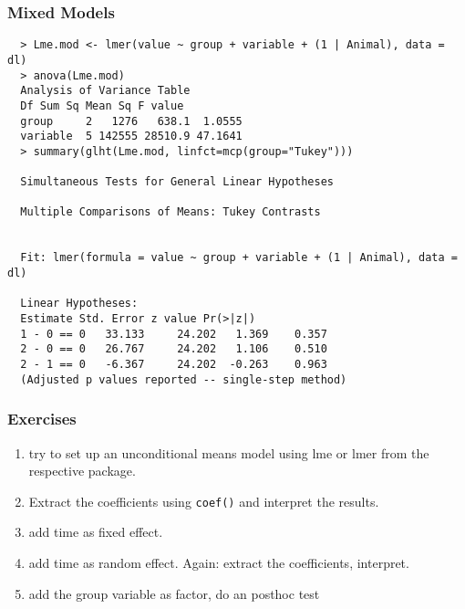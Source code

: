 \begin{frame}\frametitle{Mixed Models}
\scriptsize
\begin{verbatim}
  > Lme.mod <- lmer(value ~ group + variable + (1 | Animal), data = dl)
  > anova(Lme.mod)
  Analysis of Variance Table
  Df Sum Sq Mean Sq F value
  group     2   1276   638.1  1.0555
  variable  5 142555 28510.9 47.1641
  > summary(glht(Lme.mod, linfct=mcp(group="Tukey")))

  Simultaneous Tests for General Linear Hypotheses

  Multiple Comparisons of Means: Tukey Contrasts


  Fit: lmer(formula = value ~ group + variable + (1 | Animal), data = dl)

  Linear Hypotheses:
  Estimate Std. Error z value Pr(>|z|)
  1 - 0 == 0   33.133     24.202   1.369    0.357
  2 - 0 == 0   26.767     24.202   1.106    0.510
  2 - 1 == 0   -6.367     24.202  -0.263    0.963
  (Adjusted p values reported -- single-step method)
\end{verbatim}
\end{frame}



\begin{frame}\frametitle{Exercises}
  \begin{enumerate}
  \item try to set up an unconditional means model using lme or lmer from the respective package.
  \item Extract the coefficients using \texttt{coef()} and interpret the results.
  \item add time as fixed effect.
  \item add time as random effect. Again: extract the coefficients, interpret.
  \item add the group variable as factor, do an posthoc test
  \end{enumerate}
\end{frame}


